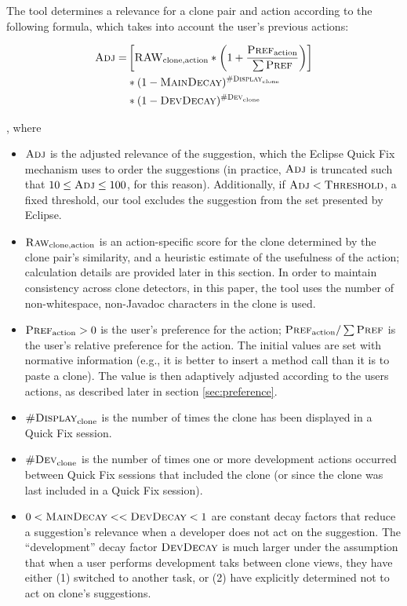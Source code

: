 \documentclass[nocopyrightspace,10pt]{sigplanconf}
\begin{document}
The tool determines a relevance for a clone pair and action according
to the following formula, which takes into account the user's previous
actions:

\begin{align*}
  \textsc{Adj} = & \left[ \textsc{RAW}_{\text{clone},\text{action}} * \left(1 + \frac{\textsc{Pref}_{\text{action}}}{\sum{\textsc{Pref}}}\right) \right] \\
      & * (1-\textsc{MainDecay})^{\textsc{\#Display}_{\text{clone}}} \\
      & * (1-\textsc{DevDecay})^{\textsc{\#Dev}_{\text{clone}}} 
\end{align*}

\noindent, where 
\begin{itemize}
  \item $\textsc{Adj}$ is the adjusted relevance of the suggestion, which the
    Eclipse Quick Fix mechanism uses to order the suggestions (in
    practice, $\textsc{Adj}$ is truncated such that $10 \le \textsc{Adj} \le 100$,
    for this reason). Additionally, if $\textsc{Adj} < \textsc{Threshold}$, a fixed threshold, our
    tool excludes the suggestion from the set presented
    by Eclipse.
  \item $\textsc{Raw}_{\text{clone},\text{action}}$ is an action-specific score for the clone
    determined by the clone pair's similarity, and a heuristic
    estimate of the usefulness of the action; calculation details
    are provided later in this section. 
    In order to maintain consistency across clone detectors, in this paper, the tool uses the
    number of non-whitespace, non-Javadoc characters in the clone is
    used.
  \item $\textsc{Pref}_{\text{action}} > 0$ is the user's preference for the action; $\textsc{Pref}_{\text{action}} / 
    \sum{\textsc{Pref}}$ is the user's relative preference for the action. The
    initial values are set with normative information (e.g., it is
    better to insert a method call than it is to paste a clone). The
    value is then adaptively adjusted according to the users actions, as described
    later in section \ref{sec:preference}.
  \item $\textsc{\#Display}_{\text{clone}}$ is the number of times the clone has been
    displayed in a Quick Fix session.
  \item $\textsc{\#Dev}_{\text{clone}}$ is the number of times one or more development
    actions occurred between Quick Fix sessions that included the
    clone (or since the clone was last included in a Quick Fix
    session).
  \item $0 < \textsc{MainDecay} << \textsc{DevDecay} < 1$ are constant
    decay factors that reduce a suggestion's relevance when a
    developer does not act on the suggestion. The ``development'' decay
    factor $\textsc{DevDecay}$ is much larger under the assumption
    that when a user performs development taks between clone views,
    they have either (1) switched to another task, or (2) have
    explicitly determined not to act on clone's suggestions.
\end{itemize} 
\end{document}
